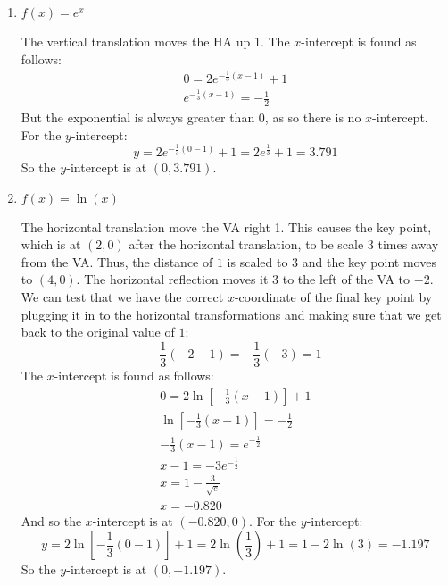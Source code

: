 \documentclass[letterpaper,12pt,fleqn]{article}
\begin{document}
\begin{enumerate}[left=0pt]
\item \(f(x)=e^x\)

  The vertical translation moves the HA up 1.  The \(x\)-intercept is found as follows:
  \begin{gather*}
    0=2e^{-\frac{1}{3}(x-1)}+1 \\
    e^{-\frac{1}{3}(x-1)}=-\frac{1}{2}
  \end{gather*}
  But the exponential is always greater than 0, as so there is no \(x\)-intercept.  For the \(y\)-intercept:
  \[y=2e^{-\frac{1}{3}(0-1)}+1=2e^{\frac{1}{3}}+1=3.791\]
  So the \(y\)-intercept is at \((0,3.791)\).

  \begin{center}
  \end{center}

\item \(f(x)=\ln(x)\)

  The horizontal translation move the VA right 1.  This causes the key point, which is at \((2,0)\) after the
  horizontal translation, to be scale \(3\) times away from the VA.  Thus, the distance of \(1\) is scaled to \(3\)
  and the key point moves to \((4,0)\). The horizontal reflection moves it 3 to the left of the VA to \(-2\).  We
  can test that we have the correct \(x\)-coordinate of the final key point by plugging it in to the horizontal
  transformations and making sure that we get back to the original value of \(1\):
  \[-\frac{1}{3}(-2-1)=-\frac{1}{3}(-3)=1\]
  The \(x\)-intercept is found as follows:
  \begin{gather*}
    0=2\ln\left[-\frac{1}{3}(x-1)\right]+1 \\
    \ln\left[-\frac{1}{3}(x-1)\right]=-\frac{1}{2} \\
    -\frac{1}{3}(x-1)=e^{-\frac{1}{2}} \\
    x-1=-3e^{-\frac{1}{2}} \\
    x=1-\frac{3}{\sqrt{e}} \\
    x=-0.820
  \end{gather*}
  And so the \(x\)-intercept is at \((-0.820,0)\).  For the \(y\)-intercept:
  \[y=2\ln\left[-\frac{1}{3}(0-1)\right]+1=2\ln\left(\frac{1}{3}\right)+1=1-2\ln(3)=-1.197\]
  So the \(y\)-intercept is at \((0,-1.197)\).


\end{enumerate}
\end{document}

